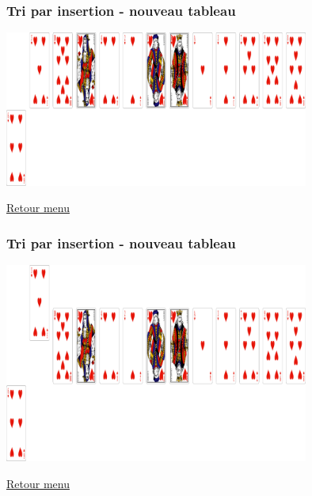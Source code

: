 \documentclass[svgnames,11pt]{beamer}
\begin{document}
\begin{frame}
    \frametitle{Tri par insertion - nouveau tableau}

    \begin{center}
        \centering
        \includegraphics[width=10cm]{ressources/insertion2-2.png}
        \label{pique}
    \end{center}
    \hyperlink{menu}{Retour menu}

\end{frame}


\begin{frame}
    \frametitle{Tri par insertion - nouveau tableau}

    \begin{center}
        \centering
        \includegraphics[width=10cm]{ressources/insertion2-3.png}
        \label{pique}
    \end{center}
    \hyperlink{menu}{Retour menu}

\end{frame}
\end{document}
